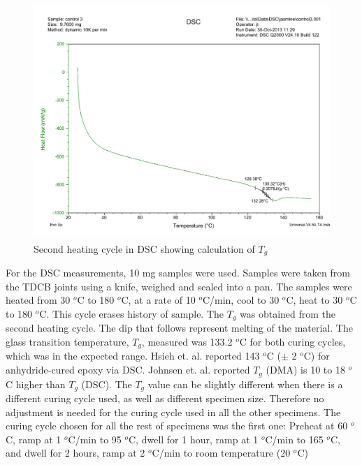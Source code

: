 \documentclass[numbers=noendperiod,chapterprefix=on]{icldt} %
\begin{document}
\begin{figure}[!htpb]
\centering
\includegraphics[height=9cm]{DSC_cycle}
\caption{Second heating cycle in DSC showing calculation of $ T_{g} $} \label{DSC_cycle}
\end{figure}

For the DSC measurements, 10 mg samples were used. Samples were taken from the TDCB joints using a knife, weighed and sealed into a pan. The samples were heated from 30 $^o$C to 180 $^o$C, at a rate of 10 $^o$C/min,
cool to 30 $^o$C, heat to 30 $^o$C to 180 $^o$C. This cycle erases history of sample.
The $ T_{g} $ was obtained from the second heating cycle. The dip that follows represent melting of the material. The glass transition temperature, $ T_{g} $, measured was 133.2 $^o$C for both curing cycles, which was in the expected range. Hsieh et. al. \cite{Hsieh2010a} reported 143 $^o$C ($ \pm $ 2 $^o$C) for anhydride-cured epoxy via DSC. Johnsen et. al. \cite{Johnsen2007} reported $ T_{g} $ (DMA) is 10 to 18 $^o$C higher than $ T_{g} $ (DSC).
The $ T_{g} $ value can be slightly different when there is a different curing cycle used, as well as different specimen size. Therefore no adjustment is needed for the curing cycle used in all the other specimens. The curing cycle chosen for all the rest of specimens was the first one: Preheat at 60 $^o$C, ramp at 1 $^o$C/min to 95 $^o$C, dwell for 1 hour, ramp at 1 $^o$C/min to 165 $^o$C, and dwell for 2 hours, ramp at 2 $^o$C/min to room temperature (20 $^o$C)
\end{document}

